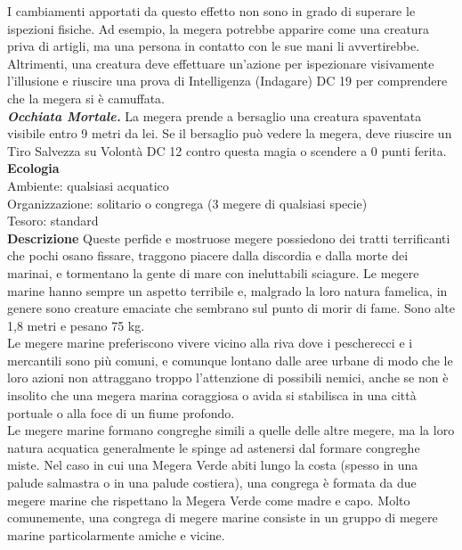 \begin{multicols}{2}
I cambiamenti apportati da questo effetto non sono in grado di superare le ispezioni fisiche. Ad esempio, la megera potrebbe apparire come una creatura priva di artigli, ma una persona in contatto con le sue mani li avvertirebbe. Altrimenti, una creatura deve effettuare un'azione per ispezionare visivamente l'illusione e riuscire una prova di Intelligenza (Indagare) DC  19 per comprendere che la megera si è camuffata.\\

\emph{\textbf{Occhiata Mortale.}} La megera prende a bersaglio una creatura spaventata visibile entro 9 metri da lei. Se il bersaglio può vedere la megera, deve riuscire un Tiro Salvezza su Volontà DC  12 contro questa magia o scendere a 0 punti ferita.
\textbf{Ecologia}\\
Ambiente: qualsiasi acquatico\\
Organizzazione: solitario o congrega (3 megere di qualsiasi specie)\\
Tesoro: standard\\
\textbf{Descrizione}
Queste perfide e mostruose megere possiedono dei tratti terrificanti che pochi osano fissare, traggono piacere dalla discordia e dalla morte dei marinai, e tormentano la gente di mare con ineluttabili sciagure. Le megere marine hanno sempre un aspetto terribile e, malgrado la loro natura famelica, in genere sono creature emaciate che sembrano sul punto di morir di fame. Sono alte 1,8 metri e pesano 75 kg.\\

Le megere marine preferiscono vivere vicino alla riva dove i pescherecci e i mercantili sono più comuni, e comunque lontano dalle aree urbane di modo che le loro azioni non attraggano troppo l'attenzione di possibili nemici, anche se non è insolito che una megera marina coraggiosa o avida si stabilisca in una città portuale o alla foce di un fiume profondo.\\

Le megere marine formano congreghe simili a quelle delle altre megere, ma la loro natura acquatica generalmente le spinge ad astenersi dal formare congreghe miste. Nel caso in cui una Megera Verde abiti lungo la costa (spesso in una palude salmastra o in una palude costiera), una congrega è formata da due megere marine che rispettano la Megera Verde come madre e capo. Molto comunemente, una congrega di megere marine consiste in un gruppo di megere marine particolarmente amiche e vicine.\\


\end{multicols}
